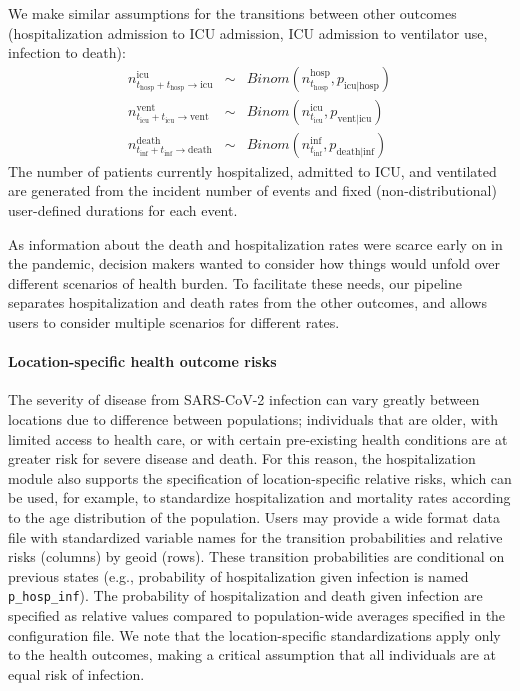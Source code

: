 We make similar assumptions for the transitions between other outcomes (hospitalization admission to ICU admission, ICU admission to ventilator use, infection to death):
\begin{eqnarray}
n_{t_\text{hosp} + t_\text{hosp}\to \text{icu}}^\text{icu} &\sim & Binom\left(n_{t_\text{hosp}}^\text{hosp} , p_{\text{icu}| \text{hosp}} \right)\\
n_{t_\text{icu} + t_\text{icu} \to \text{vent}}^\text{vent} &\sim & Binom\left(n_{t_\text{icu}}^\text{icu}, p_{\text{vent} | \text{icu}} \right) \\
n_{t_\text{inf} + t_\text{inf} \to \text{death}}^\text{death} &\sim & Binom\left(n_{t_\text{inf}}^\text{inf}, p_{\text{death}| \text{inf}}  \right)
\end{eqnarray}
The number of patients currently hospitalized, admitted to ICU, and ventilated are generated from the incident number of events and fixed (non-distributional) user-defined durations for each event.

As information about the death and hospitalization rates were scarce early on in the pandemic, decision makers wanted to consider how things would unfold over different scenarios of health burden. To facilitate these needs, our pipeline separates hospitalization and death rates from the other outcomes, and allows users to consider multiple scenarios for different rates.

\paragraph{Location-specific health outcome risks}
The severity of disease from SARS-CoV-2 infection can vary greatly between locations due to difference between populations; individuals that are older, with limited access to health care, or with certain pre-existing health conditions are at greater risk for severe disease and death. For this reason, the hospitalization module also supports the specification of location-specific relative risks, which can be used, for example, to standardize hospitalization and mortality rates according to the age distribution of the population. Users may provide a wide format data file with standardized variable names for the transition probabilities and relative risks (columns) by geoid (rows). These transition probabilities are conditional on previous states (e.g., probability of hospitalization given infection is named \verb|p_hosp_inf|). The probability of hospitalization and death given infection are specified as relative values compared to population-wide averages specified in the configuration file. We note that the location-specific standardizations apply only to the health outcomes, making a critical assumption that all individuals are at equal risk of infection.

